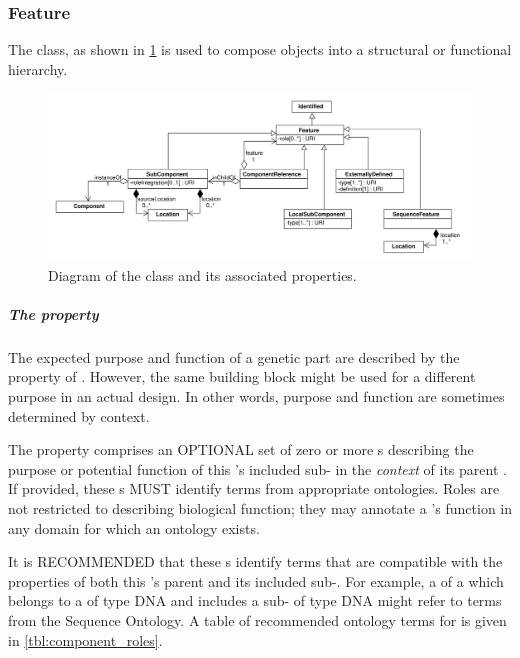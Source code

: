 \subsubsection{Feature}
\label{sec:Feature}

The  class, as shown in \ref{uml:subcomponent} is used to compose  objects into a structural or functional hierarchy. 

\begin{figure}[ht]
\begin{center}
\includegraphics[width=\textwidth]{uml/feature}
\caption[]{Diagram of the  class and its associated properties.}
\label{uml:subcomponent}
\end{center}
\end{figure}

\subparagraph{The  property}\label{sec:roles:C}

The expected purpose and function of a genetic part are described by the
 property of . However, the same building block might be used for a different purpose in an actual design. In other words, purpose and function are sometimes determined by context. 

The  property comprises an OPTIONAL set of zero or more  s describing the purpose or potential function of this 's included sub- in the \textit{context} of its parent .
If provided, these  s MUST identify terms from appropriate ontologies. Roles are not restricted to describing biological function; they may annotate a 's function in any domain for which an ontology exists.

It is RECOMMENDED that these  s identify terms that are compatible with the  properties of both this 's parent  and its included sub-. For example, a  of a  which belongs to a  of type DNA and includes a sub- of type DNA might refer to terms from the Sequence Ontology. A table of recommended ontology terms for  is given in \ref{tbl:component_roles}.

